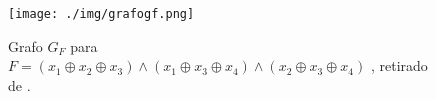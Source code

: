 \begin{figure}[htb]	
\center%
\texttt{[image: ./img/grafogf.png]}
\caption{Grafo $G_{F}$ para $F=(x_{1} \oplus x_{2} \oplus x_{3}) \wedge (x_{1} \oplus x_{3} \oplus x_{4}) \wedge (x_{2} \oplus x_{3} \oplus x_{4})$ , retirado de \cite{heldt2014}.}
\label{fig:grafogf}
\end{figure}